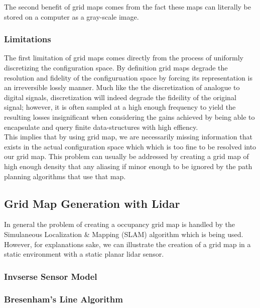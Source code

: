 \documentclass[journal]{IEEEtran}
\begin{document}
The second benefit of grid maps comes from the fact these maps can literally be stored on a computer as a gray-scale image. 


\subsubsection{Limitations}

The first limitation of grid maps comes directly from the process of uniformly discretizing the configuration space. By definition grid maps degrade the resolution and fidelity of the configuruation space by forcing its representation is an irreversible lossly manner. Much like the the discretization of analogue to digital signals, discretization will indeed degrade the fideility of the original signal; however, it is often sampled at a high enough frequency to yield the resulting losses insignificant when considering the gains achieved by being able to encapsulate and query finite data-structures with high effiency. \\

This implies that by using grid map, we are necessarily missing information that exists in the actual configuration space which which is too fine to be resolved into our grid map. This problem can usually be addressed by creating a grid map of high enough density that any aliasing if minor enough to be ignored by the path planning algorithms that use that map. 

\subsection{Grid Map Generation with Lidar}

In general the problem of creating a occupancy grid map is handled by the Simulaneous Localization \& Mapping (SLAM) algorithm which is being used. However, for explanations sake, we can illustrate the creation of a grid map in a static environment with a static planar lidar sensor. 


\subsubsection{Invserse Sensor Model}

\subsubsection{Bresenham's Line Algorithm}
\end{document}
